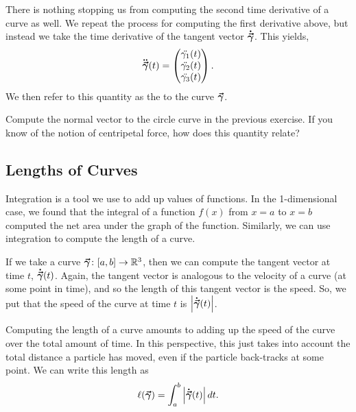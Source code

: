         There is nothing stopping us from computing the second time derivative of a curve as well.  We repeat the process for computing the first derivative above, but instead we take the time derivative of the tangent vector $\boldsymbol{\dot{\vec{\gamma}}}$.  This yields,
                \[
                \boldsymbol{\ddot{\vec{\gamma}}}(t) = \begin{pmatrix} \ddot{\gamma_1}(t) \\ \ddot{\gamma_2}(t) \\ \ddot{\gamma_3}(t) \end{pmatrix}.
                \]
         We then refer to this quantity as the  to the curve $\boldsymbol{\vec{\gamma}}$. 
         
         \begin{exercise}
         	Compute the normal vector to the circle curve in the previous exercise.  If you know of the notion of centripetal force, how does this quantity relate?
         \end{exercise}
         
         \subsection{Lengths of Curves}
        
        Integration is a tool we use to add up values of functions.  In the 1-dimensional case, we found that the integral of a function $f(x)$ from $x=a$ to $x=b$ computed the net area under the graph of the function.  Similarly, we can use integration to compute the length of a curve.
        
        If we take a curve $\boldsymbol{\vec{\gamma}} \colon [a,b] \to \mathbb{R}^3$, then we can compute the tangent vector at time $t$, $\boldsymbol{\dot{\vec{\gamma}}}(t)$. Again, the tangent vector is analogous to the velocity of a curve (at some point in time), and so the length of this tangent vector is the speed.  So, we put that the speed of the curve at time $t$ is $\left| \boldsymbol{\dot{\vec{\gamma}}}(t)\right|$.  
        
        Computing the length of a curve amounts to adding up the speed of the curve over the total amount of time.  In this perspective, this just takes into account the total distance a particle has moved, even if the particle back-tracks at some point. We can write this length as
        \[
        \ell(\boldsymbol{\vec{\gamma}}) = \int_a^b \left|\boldsymbol{\dot{\vec{\gamma}}}(t)\right|dt.
        \]
        
